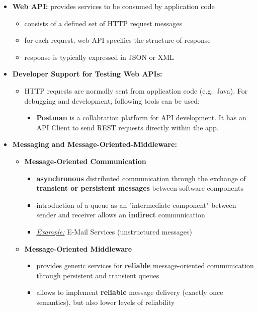 \documentclass[ieeetran]{article}
\begin{document}
\begin{itemize}
\item \textbf{Web API:} provides services to be consumed by application code
	\begin{itemize}
		\item  consists of a defined set of HTTP request messages
		\item for each request, web API specifies the structure of response
		\item response is typically expressed in JSON or XML
	\end{itemize}

\item \textbf{Developer Support for Testing Web APIs:}
	\begin{itemize}
	  \item HTTP requests are normally sent from application code (e.g.\ Java). For debugging and development, following tools can be used:
		  \begin{itemize}
		    \item \textbf{Postman} is a collabration platform for API development. It has an API Client to send REST requests directly within the app.
		  \end{itemize}
	\end{itemize}

\item \textbf{Messaging and Message-Oriented-Middleware:}
	\begin{itemize}
	  \item \textbf{Message-Oriented Communication}
		  \begin{itemize}
		    \item \textbf{asynchronous} distributed communication through the exchange of \textbf{transient or persistent messages} between software components
		\item introduction of a queue as an "intermediate component" between sender and receiver allows an \textbf{indirect} communication
\item \textit{\underline{Example:}} E-Mail Services (unstructured messages)
		  \end{itemize}

\item \textbf{Message-Oriented Middleware}
	\begin{itemize}
		\item provides generic services for \textbf{reliable} message-oriented communication through persistent and transient queues
		\item allows to implement \textbf{reliable} message delivery (exactly once semantics), but also lower levels of reliability


\end{itemize}
\end{itemize}
\end{itemize}
\end{document}
